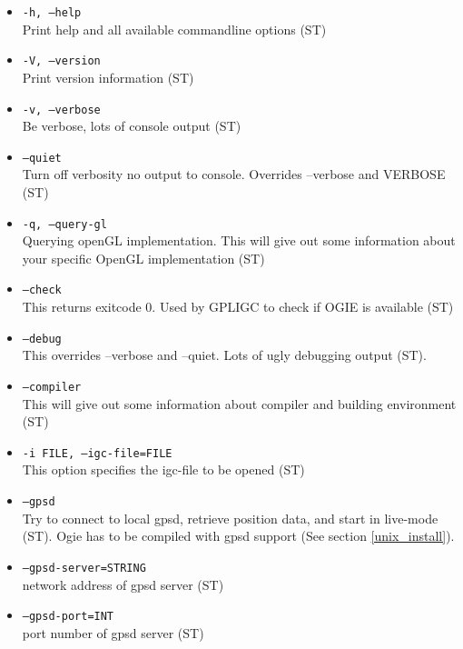 \begin{itemize}

\item \texttt{-h, --help} \\
Print help and all available commandline options (ST)

\item \texttt{-V, --version} \\
Print version information (ST)

\item \texttt{-v, --verbose} \\
Be verbose, lots of console output (ST)

\item \texttt{--quiet} \\
Turn off verbosity no output to console. Overrides --verbose and VERBOSE (ST)

\item \texttt{-q, --query-gl} \\
Querying openGL implementation. This will give out some information about your specific OpenGL implementation (ST)

\item \texttt{--check} \\
This returns exitcode 0. Used by GPLIGC to check if OGIE is available (ST)

\item \texttt{--debug} \\
This overrides --verbose and --quiet. Lots of ugly debugging output (ST).

\item \texttt{--compiler} \\
This will give out some information about compiler and building environment (ST)

\item \texttt{-i FILE, --igc-file=FILE} \\
This option specifies the igc-file to be opened (ST)

\item \texttt{--gpsd} \\
Try to connect to local gpsd, retrieve position data, and start in live-mode (ST).
Ogie has to be compiled with gpsd support (See section \ref{unix_install}).

\item \texttt{--gpsd-server=STRING} \\
network address of gpsd server (ST)

\item \texttt{--gpsd-port=INT} \\
port number of gpsd server (ST)



\end{itemize}
